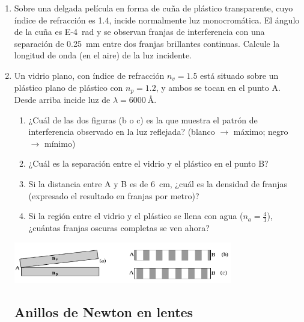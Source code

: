 \documentclass[11pt,spanish,a4paper]{article}
\begin{document}
\begin{enumerate}
\item
Sobre una delgada película en forma de cuña de plástico transparente, cuyo índice de refracción es \num{1.4}, incide normalmente luz monocromática.
El ángulo de la cuña es \SI{E-4}{\radian} y se observan franjas de interferencia con una separación de \SI{0.25}{\milli\metre} entre dos franjas brillantes continuas.
Calcule la longitud de onda (en el aire) de  la luz incidente.




\item 
Un vidrio plano, con índice de refracción \(n_v=1.5\) está situado sobre un plástico plano de plástico con \(n_p=1.2\), y ambos se tocan en el punto A.
Desde arriba incide luz de \(\lambda= \SI{6000}{\angstrom}\).
\begin{enumerate}
	\item ¿Cuál de las dos figuras (b o c) es la que muestra el patrón de interferencia observado en la luz reflejada? (blanco \(\rightarrow\) máximo; negro \(\rightarrow\) mínimo)
	\item ¿Cuál es la separación entre el vidrio y el plástico en el punto B?
	\item Si la distancia entre A y B es de \SI{6}{\centi\metre}, ¿cuál es la densidad de franjas (expresado el resultado en franjas por metro)?
	\item Si la región entre el vidrio y el plástico se llena con agua (\(n_a=\frac{4}{3}\)), ¿cuántas franjas oscuras completas se ven ahora?
\end{enumerate}
\vspace{-.6cm}
\begin{center}
\includegraphics[width=0.75\textwidth]{itba25-10.png}
\end{center}



\subsection*{Anillos de Newton en lentes}


\end{enumerate}
\end{document}
